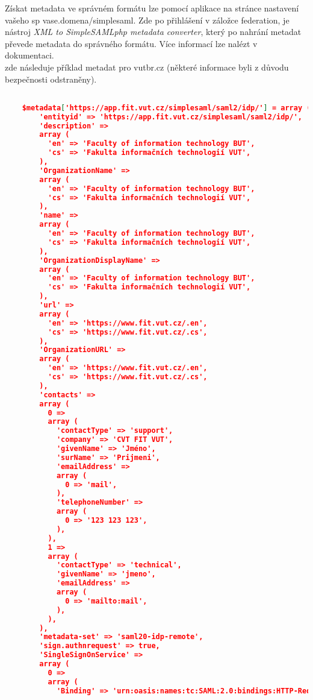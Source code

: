 Získat metadata ve správném formátu lze pomocí aplikace na stránce nastavení vašeho sp vase.domena/simplesaml.
Zde po přihlášení v záložce federation, je nástroj \emph{XML to SimpleSAMLphp metadata converter}, který po nahrání metadat převede metadata do správného formátu.
Více informací lze nalézt v dokumentaci.\cite{SimpleSAMLphp-Service-Provider-QuickStart}
\\
zde následuje příklad metadat pro vutbr.cz (některé informace byli z důvodu bezpečnosti odstraněny).
\begin{lstlisting}[language=json]

    $metadata['https://app.fit.vut.cz/simplesaml/saml2/idp/'] = array (
        'entityid' => 'https://app.fit.vut.cz/simplesaml/saml2/idp/',
        'description' =>
        array (
          'en' => 'Faculty of information technology BUT',
          'cs' => 'Fakulta informačních technologií VUT',
        ),
        'OrganizationName' =>
        array (
          'en' => 'Faculty of information technology BUT',
          'cs' => 'Fakulta informačních technologií VUT',
        ),
        'name' =>
        array (
          'en' => 'Faculty of information technology BUT',
          'cs' => 'Fakulta informačních technologií VUT',
        ),
        'OrganizationDisplayName' =>
        array (
          'en' => 'Faculty of information technology BUT',
          'cs' => 'Fakulta informačních technologií VUT',
        ),
        'url' =>
        array (
          'en' => 'https://www.fit.vut.cz/.en',
          'cs' => 'https://www.fit.vut.cz/.cs',
        ),
        'OrganizationURL' =>
        array (
          'en' => 'https://www.fit.vut.cz/.en',
          'cs' => 'https://www.fit.vut.cz/.cs',
        ),
        'contacts' =>
        array (
          0 =>
          array (
            'contactType' => 'support',
            'company' => 'CVT FIT VUT',
            'givenName' => 'Jméno',
            'surName' => 'Prijmeni',
            'emailAddress' =>
            array (
              0 => 'mail',
            ),
            'telephoneNumber' =>
            array (
              0 => '123 123 123',
            ),
          ),
          1 =>
          array (
            'contactType' => 'technical',
            'givenName' => 'jmeno',
            'emailAddress' =>
            array (
              0 => 'mailto:mail',
            ),
          ),
        ),
        'metadata-set' => 'saml20-idp-remote',
        'sign.authnrequest' => true,
        'SingleSignOnService' =>
        array (
          0 =>
          array (
            'Binding' => 'urn:oasis:names:tc:SAML:2.0:bindings:HTTP-Redirect',

\end{lstlisting}
